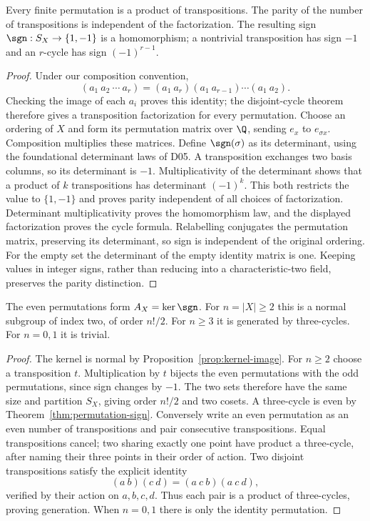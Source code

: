 \begin{theorem}\label{thm:permutation-sign}
Every finite permutation is a product of transpositions. The parity of the number of transpositions is independent of the factorization. The resulting sign $\sgn:S_X\to\{1,-1\}$ is a homomorphism; a nontrivial transposition has sign $-1$ and an $r$-cycle has sign $(-1)^{r-1}$.
\end{theorem}
\begin{proof}
Under our composition convention,
\[
 (a_1\ a_2\ \cdots\ a_r)
 =(a_1\ a_r)(a_1\ a_{r-1})\cdots(a_1\ a_2).
\]
Checking the image of each $a_i$ proves this identity; the disjoint-cycle theorem therefore gives a transposition factorization for every permutation. Choose an ordering of $X$ and form its permutation matrix over $\Q$, sending $e_x$ to $e_{\sigma x}$. Composition multiplies these matrices. Define $\sgn(\sigma)$ as its determinant, using the foundational determinant laws of D05. A transposition exchanges two basis columns, so its determinant is $-1$. Multiplicativity of the determinant shows that a product of $k$ transpositions has determinant $(-1)^k$. This both restricts the value to $\{1,-1\}$ and proves parity independent of all choices of factorization. Determinant multiplicativity proves the homomorphism law, and the displayed factorization proves the cycle formula. Relabelling conjugates the permutation matrix, preserving its determinant, so sign is independent of the original ordering. For the empty set the determinant of the empty identity matrix is one. Keeping values in integer signs, rather than reducing into a characteristic-two field, preserves the parity distinction.
\end{proof}

\begin{theorem}\label{thm:alternating-basic}
The even permutations form $A_X=\ker\sgn$. For $n=|X|\geq2$ this is a normal subgroup of index two, of order $n!/2$. For $n\geq3$ it is generated by three-cycles. For $n=0,1$ it is trivial.
\end{theorem}
\begin{proof}
The kernel is normal by Proposition~\ref{prop:kernel-image}. For $n\geq2$ choose a transposition $t$. Multiplication by $t$ bijects the even permutations with the odd permutations, since sign changes by $-1$. The two sets therefore have the same size and partition $S_X$, giving order $n!/2$ and two cosets. A three-cycle is even by Theorem~\ref{thm:permutation-sign}. Conversely write an even permutation as an even number of transpositions and pair consecutive transpositions. Equal transpositions cancel; two sharing exactly one point have product a three-cycle, after naming their three points in their order of action. Two disjoint transpositions satisfy the explicit identity
\[
 (a\ b)(c\ d)=(a\ c\ b)(a\ c\ d),
\]
verified by their action on $a,b,c,d$. Thus each pair is a product of three-cycles, proving generation. When $n=0,1$ there is only the identity permutation.
\end{proof}

